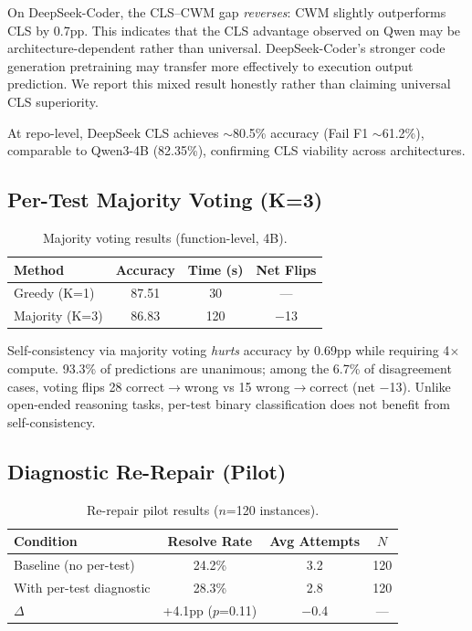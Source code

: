 \documentclass[11pt,a4paper]{article}
\begin{document}
On DeepSeek-Coder, the CLS--CWM gap \emph{reverses}: CWM slightly outperforms CLS by 0.7pp. This indicates that the CLS advantage observed on Qwen may be architecture-dependent rather than universal. DeepSeek-Coder's stronger code generation pretraining may transfer more effectively to execution output prediction. We report this mixed result honestly rather than claiming universal CLS superiority.

At repo-level, DeepSeek CLS achieves $\sim$80.5\% accuracy (Fail F1 $\sim$61.2\%), comparable to Qwen3-4B (82.35\%), confirming CLS viability across architectures.

\subsection{Per-Test Majority Voting (K=3)}
\label{sec:mv}

\begin{table}[h]
\centering
\caption{Majority voting results (function-level, 4B).}
\label{tab:mv}
\begin{tabular}{lccc}
\toprule
Method & Accuracy & Time (s) & Net Flips \\
\midrule
Greedy (K=1) & 87.51 & 30 & --- \\
Majority (K=3) & 86.83 & 120 & $-$13 \\
\bottomrule
\end{tabular}
\end{table}

Self-consistency via majority voting \emph{hurts} accuracy by 0.69pp while requiring 4$\times$ compute. 93.3\% of predictions are unanimous; among the 6.7\% of disagreement cases, voting flips 28 correct$\to$wrong vs 15 wrong$\to$correct (net $-$13). Unlike open-ended reasoning tasks, per-test binary classification does not benefit from self-consistency.

\subsection{Diagnostic Re-Repair (Pilot)}
\label{sec:rerepair}

\begin{table}[h]
\centering
\caption{Re-repair pilot results ($n$=120 instances).}
\label{tab:rerepair}
\begin{tabular}{lccc}
\toprule
Condition & Resolve Rate & Avg Attempts & $N$ \\
\midrule
Baseline (no per-test) & 24.2\% & 3.2 & 120 \\
With per-test diagnostic & 28.3\% & 2.8 & 120 \\
$\Delta$ & +4.1pp ($p$=0.11) & $-$0.4 & --- \\
\bottomrule
\end{tabular}
\end{table}
\end{document}
